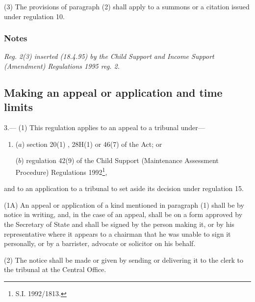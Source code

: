 \documentclass[a4paper]{article}
\newcommand\amendment[1]{\subsubsection*{Notes}{\itshape\frenchspacing\footnotesize #1 \par}}
\begin{document}
(3) The provisions of paragraph (2) shall apply to a summons or a citation issued under regulation 10.

\amendment{
Reg. 2(3) inserted (18.4.95) by the Child Support and Income Support (Amendment) Regulations 1995 reg. 2.
}

\subsection[3. Making an appeal or application and time limits]{Making an appeal or application and time limits}

3.—%
(1) This regulation applies to an appeal to a tribunal under—
\begin{enumerate}\item[]
($a$) section 20(1)%
, 28H(1)  %
or 46(7) of the Act; or

($b$) regulation 42(9) of the Child Support (Maintenance Assessment Procedure) Regulations 1992\footnote{\frenchspacing S.I. 1992/1813.},
\end{enumerate}
and to an application to a tribunal to set aside its decision under regulation 15.


(1A) An appeal or application of a kind mentioned in paragraph (1) shall be by notice in writing, and, in the case of an appeal, shall be on a form approved by the Secretary of State and shall be signed by the person making it, or by his representative where it appears to a chairman that he was unable to sign it personally, or by a barrister, advocate or solicitor on his behalf.

(2) The notice shall be made or given by sending or delivering it to the clerk to the tribunal at the Central Office.
\end{document}
